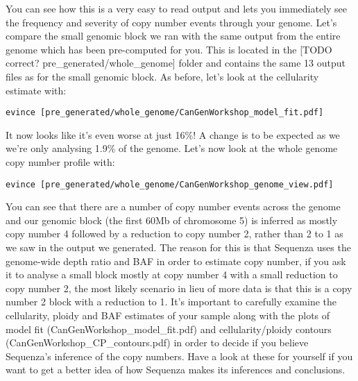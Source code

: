 You can see how this is a very easy to read output and lets you immediately see the frequency and severity of copy number events through your genome. Let's compare the small genomic block we ran with the same output from the entire genome which has been pre-computed for you. This is located in the [TODO correct? pre_generated/whole_genome] folder and contains the same 13 output files as for the small genomic block. As before, let's look at the cellularity estimate with:

\begin{steps}
\begin{lstlisting}
evince [pre_generated/whole_genome/CanGenWorkshop_model_fit.pdf]
\end{lstlisting}
\end{steps}

It now looks like it's even worse at just 16\%! A change is to be expected as we we're only analysing 1.9\% of the genome. Let's now look at the whole genome copy number profile with:

\begin{steps}
\begin{lstlisting}
evince [pre_generated/whole_genome/CanGenWorkshop_genome_view.pdf]
\end{lstlisting}
\end{steps}

You can see that there are a number of copy number events across the genome and our genomic block (the first 60Mb of chromosome 5) is inferred as mostly copy number 4 followed by a reduction to copy number 2, rather than 2 to 1 as we saw in the output we generated. The reason for this is that Sequenza uses the genome-wide depth ratio and BAF in order to estimate copy number, if you ask it to analyse a small block mostly at copy number 4 with a small reduction to copy number 2, the most likely scenario in lieu of more data is that this is a copy number 2 block with a reduction to 1. It's important to carefully examine the cellularity, ploidy and BAF estimates of your sample along with the plots of model fit (CanGenWorkshop_model_fit.pdf) and cellularity/ploidy contours (CanGenWorkshop_CP_contours.pdf) in order to decide if you believe Sequenza's inference of the copy numbers. Have a look at these for yourself if you want to get a better idea of how Sequenza makes its inferences and conclusions.


\newpage

